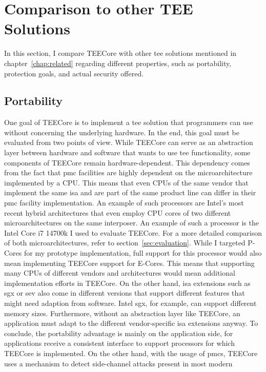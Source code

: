 \section{Comparison to other TEE Solutions}
\label{eval:compare}
In this section, I compare TEECore with other \gls{tee} solutions mentioned in
chapter~\ref{chap:related} regarding different properties, such as portability,
protection goals, and actual security offered.

\subsection{Portability}
\label{eval:compare:portability}
One goal of TEECore is to implement a \gls{tee} solution that programmers can
use without concerning the underlying hardware. In the end, this goal must be
evaluated from two points of view. While TEECore can serve as an abstraction
layer between hardware and software that wants to use \gls{tee} functionality,
some components of TEECore remain hardware-dependent. This dependency comes from
the fact that \gls{pmc} facilities are highly dependent on the microarchitecture
implemented by a CPU. This means that even CPUs of the same vendor that
implement the same \gls{isa} and are part of the same product line can differ in
their \gls{pmc} facility implementation. An example of such processors are
Intel's most recent hybrid architectures that even employ CPU cores of two
different microarchitectures on the same interposer. An example of such a
processor is the Intel Core i7 14700k I used to evaluate TEECore. For a more
detailed comparison of both microarchitectures, refer to
section~\ref{sec:evaluation}. While I targeted P-Cores for my prototype
implementation, full support for this processor would also mean implementing
TEECore support for E-Cores. This means that supporting many CPUs of different
vendors and architectures would mean additional implementation efforts in
TEECore. On the other hand, \gls{isa} extensions such as \gls{sgx} or \gls{sev}
also come in different versions that support different features that might need
adaption from software. Intel \gls{sgx}, for example, can support different
memory sizes. Furthermore, without an abstraction layer like TEECore, an
application must adapt to the different vendor-specific \gls{isa} extensions
anyway. To conclude, the portability advantage is mainly on the application
side, for applications receive a consistent interface to support processors for
which TEECore is implemented. On the other hand, with the usage of \glspl{pmc},
TEECore uses a mechanism to detect side-channel attacks present in most modern
